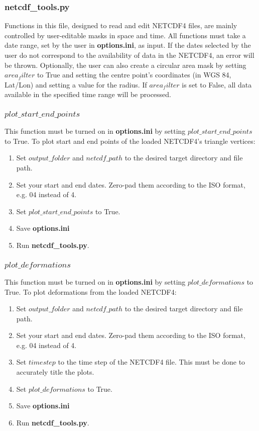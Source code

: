 \documentclass[12pt]{article}
\begin{document}
\subsubsection*{\textbf{netcdf\_tools.py}}

Functions in this file, designed to read and edit NETCDF4 files, are mainly controlled by user-editable masks in space and time. All functions must take a date range, set by the user in \textbf{options.ini}, as input. If the dates selected by the user do not correspond to the availability of data in the NETCDF4, an error will be thrown. Optionally, the user can also create a circular area mask by setting $area_filter$ to True and setting the centre point's coordinates (in WGS 84, Lat/Lon) and setting a value for the radius. If $area_filter$ is set to False, all data available in the specified time range will be processed.

\subsubsection*{$plot\_start\_end\_points$}

This function must be turned on in \textbf{options.ini} by setting $plot\_start\_end\_points$ to True. To plot start and end points of the loaded NETCDF4's triangle vertices:

\begin{enumerate}
    \item Set $output\_folder$ and $netcdf\_path$ to the desired target directory and file path.
    \item Set your start and end dates. Zero-pad them according to the ISO format, e.g. 04 instead of 4.
    \item Set $plot\_start\_end\_points$ to True.
    \item Save \textbf{options.ini}
    \item Run \textbf{netcdf\_tools.py}.
\end{enumerate}

\subsubsection*{$plot\_deformations$}

This function must be turned on in \textbf{options.ini} by setting $plot\_deformations$ to True. To plot deformations from the loaded NETCDF4:

\begin{enumerate}
    \item Set $output\_folder$ and $netcdf\_path$ to the desired target directory and file path.
    \item Set your start and end dates. Zero-pad them according to the ISO format, e.g. 04 instead of 4.
    \item Set $timestep$ to the time step of the NETCDF4 file. This must be done to accurately title the plots.
    \item Set $plot\_deformations$ to True.
    \item Save \textbf{options.ini}
    \item Run \textbf{netcdf\_tools.py}.
\end{enumerate}
\end{document}

